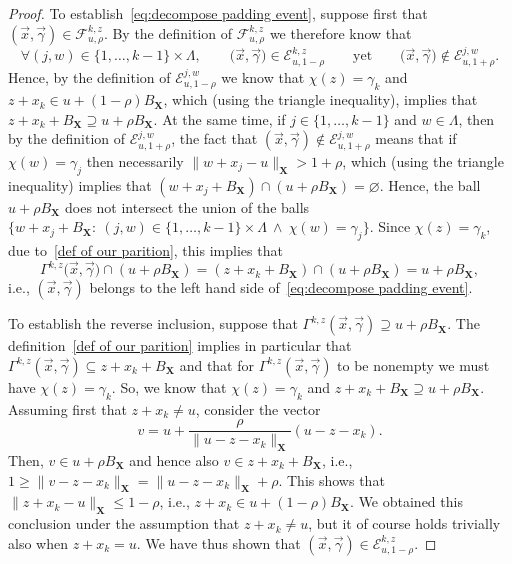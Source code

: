 \documentclass[11pt,reqno]{amsart}
\renewcommand{\le}{\leqslant}
\renewcommand{\ge}{\geqslant}
\newcommand{\X}{\mathbf X}
\theoremstyle{remark}
\renewcommand{\supset}{\supseteq}
\renewcommand{\subset}{\subseteq}
\renewcommand{\emptyset}{\varnothing}
\renewcommand{\1}{\mathbf 1}
\begin{document}
\begin{proof}
To establish~\eqref{eq:decompose padding event}, suppose first that $(\vec{x},\vec{\gamma})\in \mathscr{F}_{u,\rho}^{k,z}$. By the definition of  $\mathscr{F}_{u,\rho}^{k,z}$ we therefore know that $$\forall (j,w)\in \{1,\ldots,k-1\}\times \Lambda, \qquad \big(\vec{x},\vec{\gamma}\big)\in \mathscr{E}_{u,1-\rho}^{k,z}\qquad\mathrm{yet}\qquad  \big(\vec{x},\vec{\gamma}\big)\notin \mathscr{E}_{u,1+\rho}^{j,w}.$$
Hence, by the definition of $\mathscr{E}_{u,1-\rho}^{j,w}$ we know that $\chi(z)=\gamma_k$ and $z+x_k\in u+ (1-\rho)B_{\X}$, which (using the triangle inequality), implies that $z+x_k+B_{\X}\supset u+\rho B_{\X}$. At the same time, if $j\in \{1,\ldots,k-1\}$ and $w\in \Lambda$, then by the definition of $\mathscr{E}_{u,1+\rho}^{j,w}$, the fact that $(\vec{x},\vec{\gamma})\notin \mathscr{E}_{u,1+\rho}^{j,w}$ means that if $\chi(w)=\gamma_j$ then necessarily $\|w+x_j-u\|_{\X}>1+\rho$, which (using the triangle inequality) implies that $(w+x_j+B_{\X})\cap (u+\rho B_{\X})=\emptyset$. Hence, the ball $u+\rho B_{\X}$ does not intersect  the union of the balls $\{w+x_j+B_{\X}:\ (j,w)\in \{1,\ldots,k-1\}\times \Lambda\ \wedge\ \chi(w)=\gamma_j\}$. Since  $\chi(z)=\gamma_k$, due to~\eqref{def of our parition}, this implies that $$\Gamma^{k,z}\big(\vec{x},\vec{\gamma}\big)\cap (u+\rho B_{\X})=(z+x_k+B_{\X})\cap (u+\rho B_{\X})=u+\rho B_{\X},$$ i.e., $(\vec{x},\vec{\gamma})$ belongs to the left hand side of~\eqref{eq:decompose padding event}.

To establish the reverse inclusion, suppose that     $\Gamma^{k,z}(\vec{x},\vec{\gamma})\supset u+\rho B_{\X}$. The definition~\eqref{def of our parition}  implies in particular that $\Gamma^{k,z}(\vec{x},\vec{\gamma})\subset z+x_k+B_{\X}$ and that for $\Gamma^{k,z}(\vec{x},\vec{\gamma})$ to be nonempty we must  have $\chi(z)=\gamma_k$. So, we know that $\chi(z)=\gamma_k$ and $z+x_k+B_{\X}\supset u+\rho B_{\X}$. Assuming first that $z+x_k\neq u$,  consider the vector $$v=u+\frac{\rho}{\|u-z-x_k\|_{\X}}(u-z-x_k).$$ Then, $v\in u+\rho B_{\X}$ and hence also $v\in  z+x_k+B_{\X}$, i.e., $1\ge \|v-z-x_k\|_{\X}=\|u-z-x_k\|_{\X}+\rho$. This shows that $\|z+x_k-u\|_{\X}\le 1-\rho$, i.e., $z+x_k\in u+(1-\rho) B_{\X}$. We obtained this conclusion under the assumption that $z+x_k\neq u$, but it of course holds trivially also when $z+x_k=u$. We have thus shown that $(\vec{x},\vec{\gamma})\in \mathscr{E}_{u,1-\rho}^{k,z}$.


\end{proof}
\end{document}
